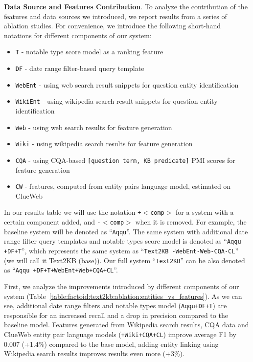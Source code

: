 \textbf{Data Source and Features Contribution}.
To analyze the contribution of the features and data sources we introduced, we report results from a series of ablation studies. For convenience, we introduce the following short-hand notations for different components of our system:

\begin{itemize}[noitemsep]
\item \texttt{T} - notable type score model as a ranking feature
\item \texttt{DF} - date range filter-based query template
\item \texttt{WebEnt} - using web search result snippets for question entity identification
\item \texttt{WikiEnt} - using wikipedia search result snippets for question entity identification
\item \texttt{Web} - using web search results for feature generation
\item \texttt{Wiki} - using wikipedia search results for feature generation
\item \texttt{CQA} - using CQA-based \texttt{[question term, KB predicate]} PMI scores for feature generation
\item \texttt{CW} - features, computed from entity pairs language model, estimated on ClueWeb
\end{itemize}

In our results table we will use the notation \texttt{+$<$comp$>$} for a system with a certain component added, and \texttt{-$<$comp$>$} when it is removed.
For example, the baseline system will be denoted as ``\texttt{Aqqu}''.
The same system with additional date range filter query templates and notable types score model is denoted as ``\texttt{Aqqu +DF+T}'', which represents the same system as ``\texttt{Text2KB -WebEnt-Web-CQA-CL}'' (we will call it Text2KB (base)).
Our full system ``\texttt{Text2KB}'' can be also denoted as ``\texttt{Aqqu +DF+T+WebEnt+Web+CQA+CL}''.

First, we analyze the improvements introduced by different components of our system (Table~\ref{table:factoid:text2kb:ablation:entities_vs_features}).
As we can see, additional date range filters and notable types model (\texttt{Aqqu+DF+T}) are responsible for an increased recall and a drop in precision compared to the baseline model.
Features generated from Wikipedia search results, CQA data and ClueWeb entity pair language models (\texttt{+Wiki+CQA+CL}) improve average F1 by 0.007 (+1.4\%) compared to the base model, adding entity linking using Wikipedia search results improves results even more (+3\%).

